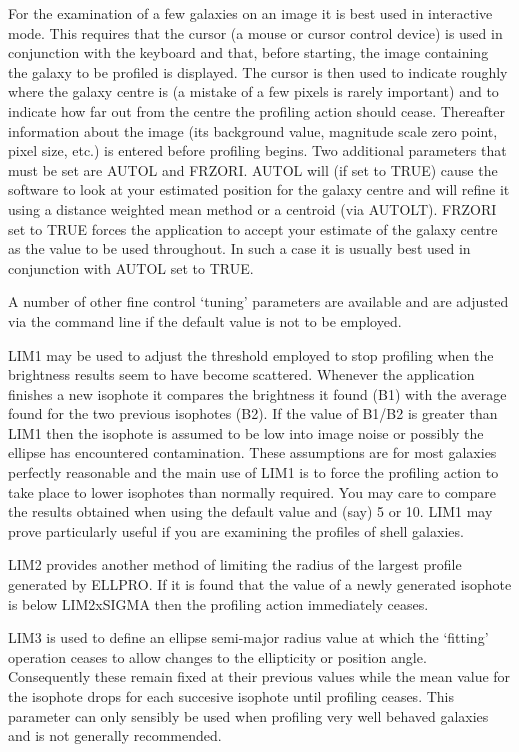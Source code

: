 \documentclass[twoside,11pt]{article}
\begin{document}
For the examination of a few galaxies on an image it is best used in
interactive mode. This requires that the cursor (a mouse or cursor
control device) is used in conjunction with the keyboard and that,
before starting, the image containing the galaxy to be profiled is
displayed. The cursor is then used to indicate roughly where the
galaxy centre is (a mistake of a few pixels is rarely important)
and to indicate how far out from the centre the profiling action
should cease. Thereafter information about the image (its background
value, magnitude scale zero point, pixel size, etc.) is entered
before profiling begins. Two additional parameters that must be set
are AUTOL and FRZORI. AUTOL will (if set to TRUE) cause the software
to look at your estimated position for the galaxy centre and will
refine it using a distance weighted mean method or a centroid (via AUTOLT).
FRZORI set to TRUE forces the application to accept your estimate of
the galaxy centre as the value to be used throughout. In such a case it
is usually best used in conjunction with AUTOL set to TRUE.

A number of other fine control `tuning' parameters are available
and are adjusted via the command line if the default value
is not to be employed.

LIM1 may be used to adjust the threshold employed to stop profiling when
the brightness results seem to have become scattered. Whenever the
application finishes a new isophote it compares the brightness it
found (B1) with the average found for the two previous isophotes (B2).
If the value of  B1/B2 is greater than LIM1 then the isophote is
assumed to be low into image noise or possibly the ellipse has
encountered contamination. These assumptions are for most galaxies
perfectly reasonable and the main use of LIM1 is to force the profiling
action to take place to lower isophotes than normally required. You
may care to compare the results obtained when using the default value and
(say) 5 or 10. LIM1 may prove particularly useful if you are examining
the profiles of shell galaxies.

LIM2 provides another method of limiting the radius of the largest profile
generated by ELLPRO. If it is found that the value of a newly
generated isophote is below LIM2xSIGMA then the profiling action immediately
ceases.

LIM3 is used to define an ellipse semi-major radius value at which
the `fitting' operation ceases to allow changes to the ellipticity or
position angle. Consequently these remain fixed at their previous values
while the mean value for the isophote drops for each succesive
isophote until profiling ceases. This parameter can only sensibly be used
when profiling very well behaved galaxies and is not generally recommended.
\end{document}
